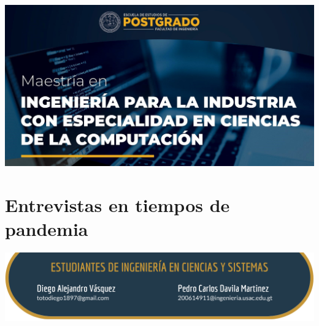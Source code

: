 \documentclass[12pt,spanish,Letterpaper,openany]{book}
\begin{document}
\begin{center}\includegraphics[width=1\linewidth]{images/publicidad12} \end{center}

\hypertarget{pareja36}{%
\chapter{Entrevistas en tiempos de pandemia}\label{pareja36}}

\begin{center}\includegraphics[width=1\linewidth]{images/pareja36_image1} \end{center}
\end{document}
